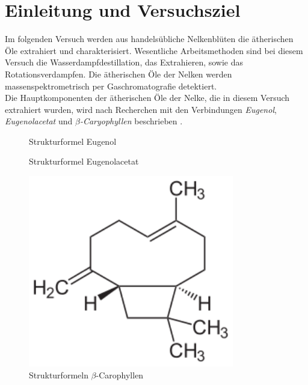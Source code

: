 \section{Einleitung und Versuchsziel}
\label{sec:aufgabenstellung}

Im folgenden Versuch werden aus handelsübliche Nelkenblüten die ätherischen Öle extrahiert und charakterisiert. Wesentliche Arbeitsmethoden sind bei diesem Versuch die Wasserdampfdestillation, das Extrahieren, sowie das Rotationsverdampfen. Die ätherischen Öle der Nelken werden massenspektrometrisch per  Gaschromatografie detektiert.\\
Die Hauptkomponenten der ätherischen Öle der Nelke, die in diesem Versuch extrahiert wurden, wird nach Recherchen mit den Verbindungen \textit{Eugenol}, \textit{Eugenolacetat} und \textit{$\beta$-Caryophyllen} beschrieben \cite{Berger.2017,Krammer.2003,ROMPPRedaktion.2002}.


\begin{figure}[h!]
	\begin{minipage}{0.32\textwidth}
			\caption{Strukturformel Eugenol}\label{fig:eugenol}
	\end{minipage}\hfill
	\begin{minipage}{0.32\textwidth}
			\caption{Strukturformel Eugenolacetat}\label{fig:eegenol_ac}
	\end{minipage}\hfill
	\begin{minipage}{0.32\textwidth}
			\includegraphics[width=0.8\textwidth]{img/caro}
			\caption{Strukturformeln $\beta$-Carophyllen}\label{fig:caro}
	\end{minipage}\hfill
\end{figure}
\FloatBarrier

		
		




